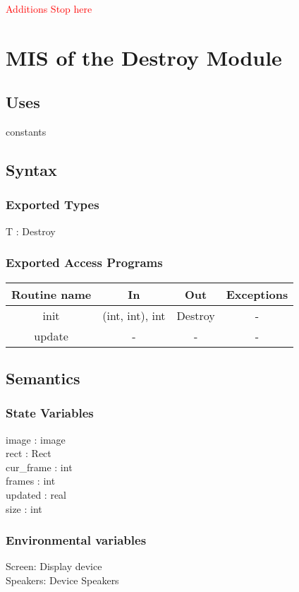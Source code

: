 \documentclass[12pt, titlepage]{article}
\begin{document}
\textcolor{red}{Additions Stop here}

\section {MIS of the Destroy Module}

\subsection {Uses}

constants

\subsection {Syntax}

\subsubsection {Exported Types}
T : Destroy
\subsubsection {Exported Access Programs}

\begin{tabular}{| c | c | c | c |}
\hline
\textbf{Routine name} & \textbf{In} & \textbf{Out} & \textbf{Exceptions}\\
\hline
init & (int, int), int & Destroy & -  \\
\hline
update & - & - & -\\
\hline
\end{tabular}

\subsection {Semantics}

\subsubsection {State Variables}
image : image\\
rect : Rect\\
cur\_frame : int\\
frames : int\\
updated : real\\
size : int\\

\subsubsection {Environmental variables}
Screen: Display device\\
Speakers: Device Speakers
\end{document}
